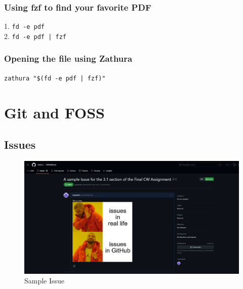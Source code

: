 \documentclass[titlepage]{article}
\begin{document}
\subsubsection{Using fzf to find your favorite PDF}
1. \texttt{fd -e pdf}\\
2. \texttt{fd -e pdf | fzf}
\subsubsection{Opening the file using Zathura}
\texttt{zathura "\$(fd -e pdf | fzf)"}
\section{Git and FOSS}
\subsection{Issues}
\begin{figure}[h]
	\centering
	\includegraphics[width=0.7\linewidth]{screenshot001}
	\caption{Sample Issue}
	\label{fig:screenshot001}
\end{figure}
\end{document}
